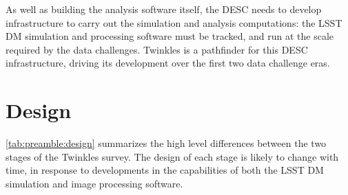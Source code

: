As well as building the analysis software itself, the DESC needs to
develop infrastructure to carry out the simulation and analysis
computations: the LSST DM simulation and processing software must be
tracked, and run at the scale required by the data challenges.
Twinkles is a pathfinder for this DESC infrastructure, driving its
development over the first two data challenge eras.


\section{Design}
\label{sec:preamble:design}

\autoref{tab:preamble:design} summarizes the high level differences
between the two stages of the Twinkles survey.
The design of each stage is likely to change with time, in response to
developments in the capabilities of both the LSST DM simulation and
image processing software.



